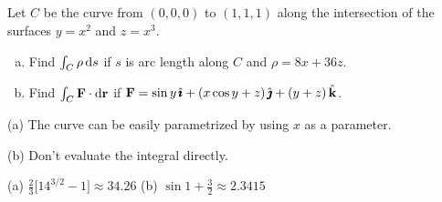 \subsection*{\Application}

\begin{question}
Let $C$ be the curve from $(0,0,0)$ to $(1,1,1)$ along the 
intersection of the surfaces $y=x^2$ and $z=x^3$.
\begin{enumerate}[(a)]
\item
Find $\int_C \rho\, \mathrm{d}s$ if $s$ is arc length along $C$ and $\rho=8x+36z$.
\item
Find $\int_C \mathbf{F}\cdot \mathrm{d}\mathbf{r}$ if
 $\mathbf{F}=\sin y\,\hat{\pmb{\imath}} + (x\cos y+z)\,\hat{\pmb{\jmath}}+ (y+z)\,\hat{\mathbf{k}}$.
\end{enumerate}
\end{question}

\begin{hint}
(a) 
The curve can be easily parametrized by using $x$ as a parameter.

(b) 
Don't evaluate the integral directly.

\end{hint}

\begin{answer}
(a) $\frac{2}{3}\big[14^{3/2}-1\big]\approx 34.26$\qquad
(b) $\sin 1+\frac{3}{2} \approx 2.3415$
\end{answer}

